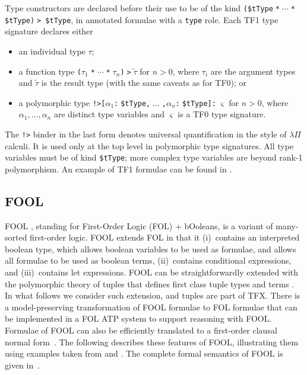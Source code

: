 Type constructors are declared before their use to be of the kind
{\tt (\$tType$\;$*$\;{\cdots}\;$*$\;$\$tType)$\;$> \$tType}, in annotated 
formulae with a \lstinline'type' role.
Each TF1 type signature declares either
\begin{itemize}
\item an individual type $\tau$;
\item a function type {\tt ($\tau_1\;$*$\;{\cdots}\;$*$\;\tau_n$)$\;$>$\;\tilde \tau$}
      for $n > 0$, where $\tau_i$ are the argument types and $\tilde \tau$
      is the result type (with the same caveats as for TF0); or
\item a polymorphic type {\tt !>[$\alpha_1$:$\;$\$tType,$\;{\dots}\;$,$\alpha_n$:$\;$\$tType]:$\;\varsigma$}
      for $n > 0$, where $\alpha_1,\dots,\alpha_n$ are distinct
      type variables and $\varsigma$ is a TF0 type signature.
\end{itemize}

The \lstinline'!>' binder in the last form denotes universal quantification in the
style of $\lambda\Pi$ calculi.
It is used only at the top level in polymorphic type signatures.
All type variables must be of kind \lstinline'$tType'; more complex type variables
are beyond rank-1 polymorphism.
An example of TF1 formulae can be found in \cite{KSR16}.

\subsection{FOOL}
\label{sec:tfx/FOOL}

FOOL \cite{FOOL}, standing for First-Order Logic (FOL) + bOoleans, is a 
variant of many-sorted first-order logic. 
FOOL extends FOL in that it (i)~contains an interpreted boolean type, which
allows boolean variables to be used as formulae, and allows all formulae to be 
used as boolean terms, (ii)~contains conditional expressions, and 
(iii)~contains let expressions.
FOOL can be straightforwardly extended with the polymorphic theory of tuples 
that defines first class tuple types and terms \cite{KKV18}.
In what follows we consider such extension, and tuples are part of TFX.
There is a model-preserving transformation of FOOL formulae to FOL formulae
\cite{FOOL} that can be implemented in a FOL ATP system to support reasoning with FOOL.
Formulae of FOOL can also be efficiently translated to a first-order clausal 
normal form~\cite{FOOLCNF}. 
The following describes these features of FOOL, illustrating them using 
examples taken from \cite{VampireAndFOOL} and \cite{KKV18}.
The complete formal semantics of FOOL is given in~\cite{FOOL}.

